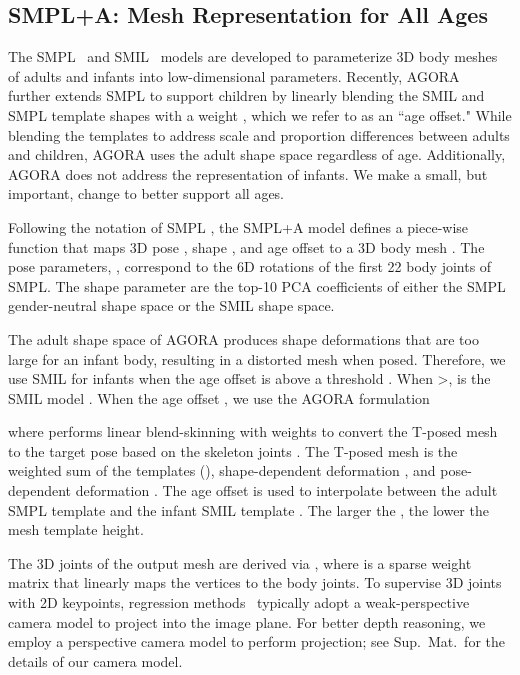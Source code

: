\documentclass[10pt,twocolumn,letterpaper]{article}
\begin{document}
\subsection{SMPL+A: Mesh Representation for All Ages}

The SMPL~\cite{smpl} and SMIL~\cite{hesse2018learning} models are developed to parameterize 3D body meshes of adults and infants into low-dimensional parameters. Recently, AGORA~\cite{patel2021agora} further extends SMPL to support children by linearly blending the SMIL and SMPL template shapes with a weight , which we refer to as an ``age offset."
While blending the templates to address scale and proportion differences between adults and children, AGORA uses the adult shape space regardless of age. 
Additionally, AGORA does not address the representation of infants.
We make a small, but important, change to better support all ages.

Following the notation of SMPL \cite{smpl}, the SMPL+A model defines a piece-wise function  that maps 3D pose , shape , and age offset  to a 3D body mesh .
The pose parameters, , correspond to the 6D  rotations \cite{Zhou_2019_CVPR} of the first 22 body joints of SMPL.
The shape parameter  are the top-10 PCA coefficients of either the SMPL gender-neutral shape space or the SMIL shape space.

The adult shape space of AGORA produces shape deformations that are too large for an infant body, resulting in a distorted mesh when posed.
Therefore, we use SMIL for infants when the age offset  is above a threshold .
When  \textgreater ,  is the SMIL model .
When the age offset , we use the AGORA formulation

where  performs linear blend-skinning with weights  to convert the T-posed mesh  to the target pose  based on the skeleton joints .
The T-posed mesh  is the weighted sum of the templates (), shape-dependent deformation , and pose-dependent deformation . 
The age offset  is used to interpolate between the adult SMPL template  and the infant SMIL template . 
The larger the , the lower the mesh template height.

The 3D joints  of the output mesh are derived via , where  is a sparse weight matrix that linearly maps the vertices  to the  body joints.
To supervise 3D joints  with 2D keypoints, regression methods~\cite{hmr,romp} typically adopt a weak-perspective camera model to project  into the image plane. 
For better depth reasoning, we employ a perspective camera model to perform projection; see Sup.~Mat.~for the details of our camera model.
\end{document}
